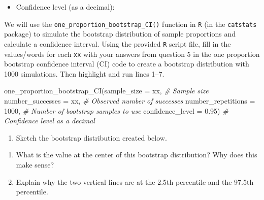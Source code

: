 \documentclass[
]{report}
\newenvironment{Shaded}{\begin{snugshade}}{\end{snugshade}}
\newcommand{\AttributeTok}[1]{\textcolor[rgb]{0.77,0.63,0.00}{#1}}
\newcommand{\CommentTok}[1]{\textcolor[rgb]{0.56,0.35,0.01}{\textit{#1}}}
\newcommand{\DecValTok}[1]{\textcolor[rgb]{0.00,0.00,0.81}{#1}}
\newcommand{\FloatTok}[1]{\textcolor[rgb]{0.00,0.00,0.81}{#1}}
\newcommand{\FunctionTok}[1]{\textcolor[rgb]{0.00,0.00,0.00}{#1}}
\newcommand{\NormalTok}[1]{#1}
\providecommand{\tightlist}{%
  \setlength{\itemsep}{0pt}\setlength{\parskip}{0pt}}
\begin{document}
\vspace{.1in}

\begin{itemize}
\tightlist
\item
  Confidence level (as a decimal):
\end{itemize}

\vspace{.1in}

We will use the \texttt{one\_proportion\_bootstrap\_CI()} function in \texttt{R} (in the \texttt{catstats} package) to simulate the bootstrap distribution of sample proportions and calculate a confidence interval. Using the provided \texttt{R} script file, fill in the values/words for each \texttt{xx} with your answers from question 5 in the one proportion bootstrap confidence interval (CI) code to create a bootstrap distribution with 1000 simulations. Then highlight and run lines 1--7.

\begin{Shaded}
\begin{Highlighting}[]
\FunctionTok{one\_proportion\_bootstrap\_CI}\NormalTok{(}\AttributeTok{sample\_size =}\NormalTok{ xx, }\CommentTok{\# Sample size}
                    \AttributeTok{number\_successes =}\NormalTok{ xx, }\CommentTok{\# Observed number of successes}
                    \AttributeTok{number\_repetitions =} \DecValTok{1000}\NormalTok{, }\CommentTok{\# Number of bootstrap samples to use}
                    \AttributeTok{confidence\_level =} \FloatTok{0.95}\NormalTok{) }\CommentTok{\# Confidence level as a decimal}
\end{Highlighting}
\end{Shaded}

\begin{enumerate}
\def\labelenumi{\arabic{enumi}.}
\setcounter{enumi}{5}
\tightlist
\item
  Sketch the bootstrap distribution created below.
\end{enumerate}

\vspace{1.8in}

\begin{enumerate}
\def\labelenumi{\arabic{enumi}.}
\setcounter{enumi}{6}
\item
  What is the value at the center of this bootstrap distribution? Why does this make sense?
  \vspace{.8in}
\item
  Explain why the two vertical lines are at the 2.5th percentile and the 97.5th percentile.
\end{enumerate}
\end{document}
